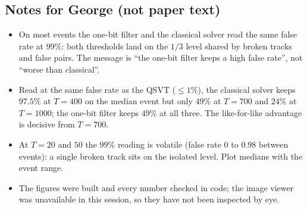 \documentclass[11pt,a4paper]{article}
\begin{document}
\subsection*{Notes for George (not paper text)}
\begin{itemize}[leftmargin=1.5em,itemsep=1pt]
\item On most events the one-bit filter and the classical solver read the same false rate at $99\%$: both thresholds land on the $1/3$ level shared by broken tracks and false pairs. The message is ``the one-bit filter keeps a high false rate'', not ``worse than classical''.
\item Read at the same false rate as the QSVT ($\le1\%$), the classical solver keeps $97.5\%$ at $T=400$ on the median event but only $49\%$ at $T=700$ and $24\%$ at $T=1000$; the one-bit filter keeps $49\%$ at all three. The like-for-like advantage is decisive from $T=700$.
\item At $T=20$ and $50$ the $99\%$ reading is volatile (false rate $0$ to $0.98$ between events): a single broken track sits on the isolated level. Plot medians with the event range.
\item The figures were built and every number checked in code; the image viewer was unavailable in this session, so they have not been inspected by eye.
\end{itemize}
\end{document}
